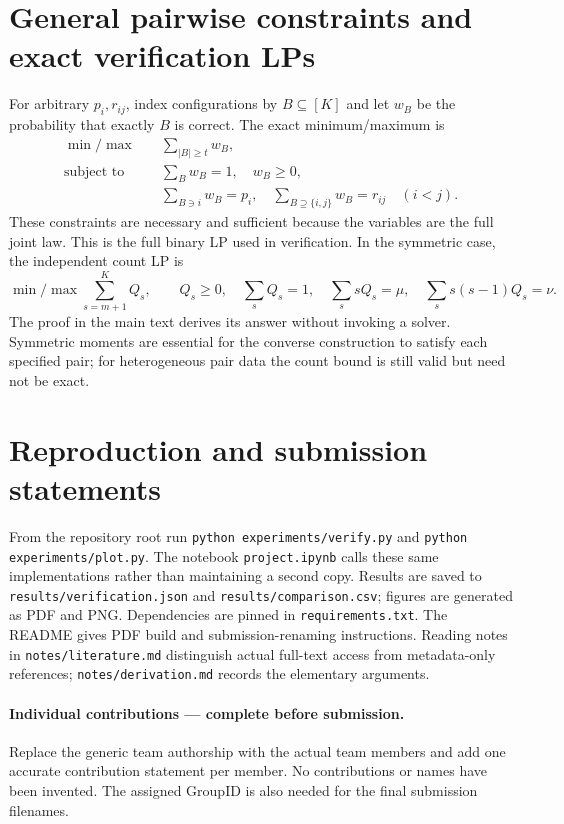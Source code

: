 \documentclass{article}
\begin{document}
\section{General pairwise constraints and exact verification LPs}\label{app:general}
For arbitrary $p_i,r_{ij}$, index configurations by $B\subseteq[K]$ and let $w_B$ be the probability that exactly $B$ is correct. The exact minimum/maximum is
\begin{equation}\label{eq:LP}
\begin{aligned}
 \min/\max\quad&\sum_{|B|\ge t}w_B,\\
 \text{subject to}\quad&\sum_Bw_B=1,\quad w_B\ge0,\\
 &\sum_{B\ni i}w_B=p_i,\quad
 \sum_{B\supseteq\{i,j\}}w_B=r_{ij}\quad(i<j).
\end{aligned}
\end{equation}
These constraints are necessary and sufficient because the variables are the full joint law. This is the full binary LP used in verification. In the symmetric case, the independent count LP is
\[
 \min/\max\sum_{s=m+1}^K Q_s,\qquad
 Q_s\ge0,\quad \sum_sQ_s=1,\quad \sum_s sQ_s=\mu,\quad
 \sum_s s(s-1)Q_s=\nu.
\]
The proof in the main text derives its answer without invoking a solver. Symmetric moments are essential for the converse construction to satisfy each specified pair; for heterogeneous pair data the count bound is still valid but need not be exact.

\section{Reproduction and submission statements}
From the repository root run \texttt{python experiments/verify.py} and \texttt{python experiments/plot.py}. The notebook \texttt{project.ipynb} calls these same implementations rather than maintaining a second copy. Results are saved to \texttt{results/verification.json} and \texttt{results/comparison.csv}; figures are generated as PDF and PNG. Dependencies are pinned in \texttt{requirements.txt}. The README gives PDF build and submission-renaming instructions. Reading notes in \texttt{notes/literature.md} distinguish actual full-text access from metadata-only references; \texttt{notes/derivation.md} records the elementary arguments.

\paragraph{Individual contributions --- complete before submission.}
Replace the generic team authorship with the actual team members and add one accurate contribution statement per member. No contributions or names have been invented. The assigned GroupID is also needed for the final submission filenames.
\end{document}
